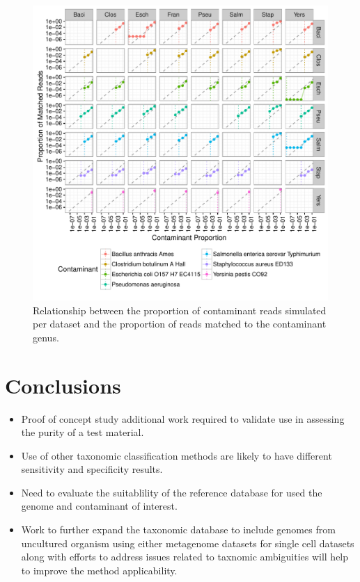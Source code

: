 \documentclass[fleqn,10pt,lineno]{wlpeerj}\usepackage[]{graphicx}\usepackage[]{color}
\makeatletter
\def\maxwidth{ %
  \ifdim\Gin@nat@width>\linewidth
    \linewidth
  \else
    \Gin@nat@width
  \fi
}
\newenvironment{knitrout}{}{} %
\makeatother
\begin{document}
\begin{knitrout}
\color{fgcolor}\begin{figure}
\includegraphics[width=\maxwidth]{figure/contam_min-1} \caption[Relationship between the proportion of contaminant reads simulated per dataset and the proportion of reads matched to the contaminant genus]{Relationship between the proportion of contaminant reads simulated per dataset and the proportion of reads matched to the contaminant genus.}\label{fig:contam_min}
\end{figure}


\end{knitrout}

\section*{Conclusions}  
\begin{itemize}
      \item Proof of concept study additional work required to validate use in assessing the purity of a test material.  
      \item Use of other taxonomic classification methods are likely to have different sensitivity and specificity results.
      \item Need to evaluate the suitablility of the reference database for used the genome and contaminant of interest.
      \item Work to further expand the taxonomic database to include genomes from uncultured organism using either metagenome datasets for single cell datasets along with efforts to address issues related to taxnomic ambiguities will help to improve the method applicability. 
\end{itemize}
\end{document}
